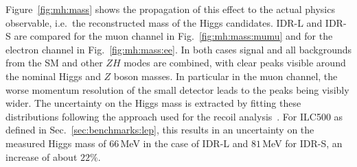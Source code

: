 Figure~\ref{fig:mh:mass} shows the propagation of this effect to the actual physics observable, i.e.\ the reconstructed mass of the Higgs candidates. IDR-L and IDR-S are compared for the muon channel in Fig.~\ref{fig:mh:mass:mumu} and for the electron channel in Fig.~\ref{fig:mh:mass:ee}. In both cases signal and all backgrounds from the SM and other $ZH$ modes are combined, with clear peaks visible around the nominal Higgs and $Z$ boson masses. In particular in the muon channel, the worse momentum resolution of the small detector leads to the peaks being visibly wider. The uncertainty on the Higgs mass is extracted by fitting these distributions following the approach used for the recoil analysis~\cite{Yan:2016xyx}. For ILC500 as defined in Sec.~\ref{sec:benchmarks:lep}, this results in an uncertainty on the measured Higgs mass of $66$\,MeV in the case of IDR-L and $81$\,MeV for IDR-S, an increase of about $22\%$.

